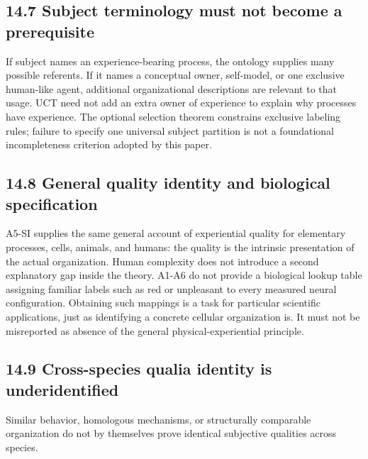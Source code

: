 \documentclass[
  11pt,
  a4paper,
]{article}
\begin{document}
\hypertarget{subject-terminology-must-not-become-a-prerequisite}{%
\subsection{14.7 Subject terminology must not become a
prerequisite}\label{subject-terminology-must-not-become-a-prerequisite}}

If subject names an experience-bearing process, the ontology supplies
many possible referents. If it names a conceptual owner, self-model, or
one exclusive human-like agent, additional organizational descriptions
are relevant to that usage. UCT need not add an extra owner of
experience to explain why processes have experience. The optional
selection theorem constrains exclusive labeling rules; failure to
specify one universal subject partition is not a foundational
incompleteness criterion adopted by this paper.

\hypertarget{general-quality-identity-and-biological-specification}{%
\subsection{14.8 General quality identity and biological
specification}\label{general-quality-identity-and-biological-specification}}

A5-SI supplies the same general account of experiential quality for
elementary processes, cells, animals, and humans: the quality is the
intrinsic presentation of the actual organization. Human complexity does
not introduce a second explanatory gap inside the theory. A1-A6 do not
provide a biological lookup table assigning familiar labels such as red
or unpleasant to every measured neural configuration. Obtaining such
mappings is a task for particular scientific applications, just as
identifying a concrete cellular organization is. It must not be
misreported as absence of the general physical-experiential principle.

\hypertarget{cross-species-qualia-identity-is-underidentified}{%
\subsection{14.9 Cross-species qualia identity is
underidentified}\label{cross-species-qualia-identity-is-underidentified}}

Similar behavior, homologous mechanisms, or structurally comparable
organization do not by themselves prove identical subjective qualities
across species.
\end{document}
